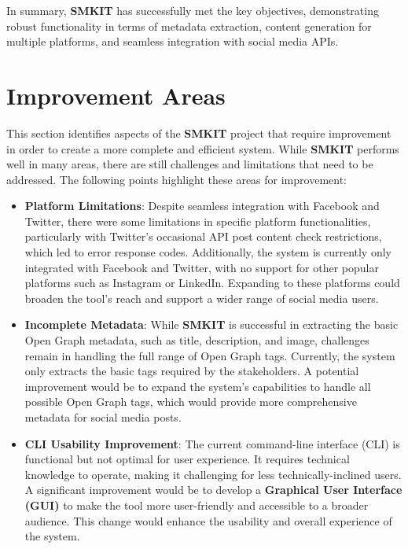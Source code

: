 In summary, \textbf{SMKIT} has successfully met the key objectives, demonstrating robust functionality in terms of metadata extraction, content generation for multiple platforms, and seamless integration with social media APIs.


\section{Improvement Areas}
\label{sec:improvement_areas}
This section identifies aspects of the \textbf{SMKIT} project that require improvement in order to create a more complete and efficient system. While \textbf{SMKIT} performs well in many areas, there are still challenges and limitations that need to be addressed. The following points highlight these areas for improvement:
\begin{itemize}
    \item \textbf{Platform Limitations}:
    Despite seamless integration with Facebook and Twitter, there were some limitations in specific platform functionalities, particularly with Twitter's occasional API post content check restrictions, which led to error response codes. Additionally, the system is currently only integrated with Facebook and Twitter, with no support for other popular platforms such as Instagram or LinkedIn. Expanding to these platforms could broaden the tool's reach and support a wider range of social media users.

    \item \textbf{Incomplete Metadata}:
    While \textbf{SMKIT} is successful in extracting the basic Open Graph metadata, such as title, description, and image, challenges remain in handling the full range of Open Graph tags. Currently, the system only extracts the basic tags required by the stakeholders. A potential improvement would be to expand the system's capabilities to handle all possible Open Graph tags, which would provide more comprehensive metadata for social media posts.

    \item \textbf{CLI Usability Improvement}: 
    The current command-line interface (CLI) is functional but not optimal for user experience. It requires technical knowledge to operate, making it challenging for less technically-inclined users. A significant improvement would be to develop a \textbf{Graphical User Interface (GUI)} to make the tool more user-friendly and accessible to a broader audience. This change would enhance the usability and overall experience of the system.


\end{itemize}
